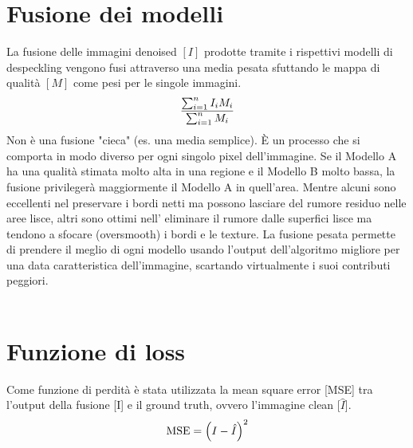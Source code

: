 \section{Fusione dei modelli}
La fusione delle immagini denoised $[I]$ prodotte tramite i rispettivi modelli di despeckling vengono fusi attraverso una media pesata sfuttando
le mappa di qualità $[M]$ come pesi per le singole immagini.
\begin{equation}
    \makebox[\textwidth][c]{%
      $\displaystyle
        \frac{\sum_{i=1}^{n} I_i M_i}{\sum_{i=1}^{n} M_i}
      $%
    }
\end{equation}
Non è una fusione "cieca" (es. una media semplice). È un processo che si 
comporta in modo diverso per ogni singolo pixel dell'immagine. Se il Modello A ha una qualità stimata 
molto alta in una regione e il Modello B molto bassa, la fusione privilegerà maggiormente 
il Modello A in quell'area. Mentre alcuni sono eccellenti nel preservare i bordi netti ma possono lasciare del rumore residuo nelle aree lisce, 
altri sono ottimi nell' eliminare il rumore dalle superfici lisce ma tendono a sfocare (oversmooth) i bordi e le texture.
La fusione pesata permette di prendere il meglio di ogni modello usando l'output dell'algoritmo migliore per una data 
caratteristica dell'immagine, scartando virtualmente i suoi contributi peggiori.
\\\\
\section{Funzione di loss}
Come funzione di perdità è stata utilizzata la mean square error [MSE] tra l'output della fusione [I] 
e il ground truth, ovvero l'immagine clean [$\hat{I}$]. 
\begin{equation}
  \makebox[\textwidth][c]{%
    $\displaystyle
    \text{MSE} = \left( I - \hat{I} \right)^2
    $%
  }
\end{equation}


